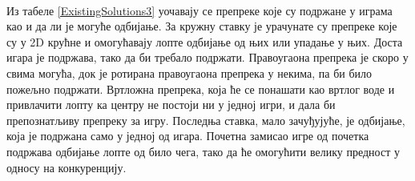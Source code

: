 \\ \indent
Из табеле \ref{ExistingSolutions3} уочавају се препреке које су подржане у играма као и да ли је могуће одбијање. За кружну ставку је урачунате су препреке које су у 2D крућне и омогућавају лопте одбијање од њих или упадање у њих. Доста игара је подржава, тако да би требало подржати. Правоугаона препрека је скоро у свима могућа, док је ротирана правоугаона препрека у некима, па би било пожељно подржати. Вртложна препрека, која ће се понашати као вртлог воде и привлачити лопту ка центру не постоји ни у једној игри, и дала би препознатљиву препреку за игру. Последња ставка, мало зачуђујуће, је одбијање, која је подржана само у једној од игара. Почетна замисао игре од почетка подржава одбијање лопте од било чега, тако да ће омогућити велику предност у односу на конкуренцију.

